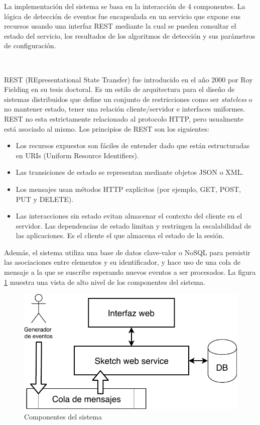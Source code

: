 \documentclass[a4paper,12pt, oneside]{article}
\begin{document}
La implementación del sistema se basa en la interacción de 4 componentes. La lógica de detección de eventos fue encapsulada en un servicio que expone sus recursos usando una interfaz REST mediante la cual se pueden consultar el estado del servicio, los resultados de los algoritmos de detección y sus parámetros de configuración. 

\

REST (REpresentational State Transfer) fue introducido en el año 2000 por Roy Fielding en su tesis doctoral\cite{Fielding:2000:ASD:932295}. Es un estilo de arquitectura para el diseño de sistemas distribuidos que define un conjunto de restricciones como ser \textit{stateless} o no mantener estado, tener una relación cliente/servidor e interfaces uniformes. REST no esta estrictamente relacionado al protocolo HTTP, pero usualmente está asociado al mismo. Los principios de REST son los siguientes:

\begin{itemize}
	\item Los recursos expuestos son fáciles de entender dado que están estructuradas en URIs (Uniform Resource Identifiers).
	\item Las transiciones de estado se representan mediante objetos JSON o XML.
	\item Los mensajes usan métodos HTTP explícitos (por ejemplo, GET, POST, PUT y DELETE).
	\item Las interacciones sin estado evitan almacenar el contexto del cliente en el servidor. Las dependencias de estado limitan y restringen la escalabilidad de las aplicaciones. Es el cliente el que almacena el estado de la sesión.
\end{itemize}

Además, el sistema utiliza una base de datos clave-valor o NoSQL para persistir las asociaciones entre elementos y su identificador, y hace uso de una cola de mensaje a la que se suscribe esperando nuevos eventos a ser procesados. La figura \ref{fig:system_components_overview} muestra una vista de alto nivel de los componentes del sistema.

\begin{figure}[htp]
	\centering
	\includegraphics[width=.6\textwidth]{./graph/system_components_overview.pdf}
	\caption{Componentes del sistema}
	\label{fig:system_components_overview}
	\medskip
	\small
\end{figure}
\end{document}
